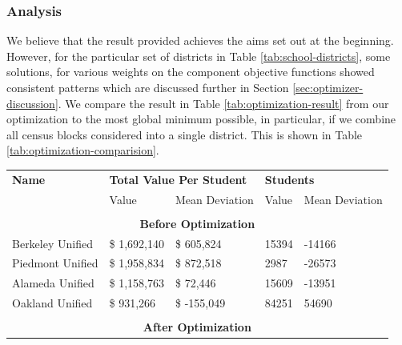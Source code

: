 \documentclass{article}
\begin{document}
\subsubsection{Analysis}
We believe that the result provided achieves the aims set out at the beginning. However, for the particular set of districts in Table \ref{tab:school-districts}, some solutions, for various weights on the component objective functions showed consistent patterns which are discussed further in Section \ref{sec:optimizer-discussion}. We compare the result in Table \ref{tab:optimization-result} from our optimization to the most global minimum possible, in particular, if we combine all census blocks considered into a single district. This is shown in Table \ref{tab:optimization-comparision}.

\begin{table}[H]
    \centering
    \begin{tabular}{l|ll|ll} \hline
         \textbf{Name}      & \multicolumn{2}{l|}{\textbf{Total Value Per Student}}         & \multicolumn{2}{l}{\textbf{Students}}\\
                            & Value                                       & Mean Deviation  & Value  & Mean Deviation \\ \hline
         \multicolumn{5}{c}{} \\
         \multicolumn{5}{c}{\textbf{Before Optimization}} \\ \hline
         Berkeley Unified   & \$ 1,692,140                                & \$ 605,824      & 15394  & -14166 \\
         Piedmont Unified   & \$ 1,958,834                                & \$ 872,518      & 2987   & -26573 \\ 
         Alameda Unified    & \$ 1,158,763                                & \$ 72,446       & 15609  & -13951  \\ 
         Oakland Unified    & \$ 931,266                                  & \$ -155,049     & 84251  &  54690 \\ 
         \multicolumn{5}{c}{} \\
         \multicolumn{5}{c}{\textbf{After Optimization}} \\ \hline

\end{tabular}
\end{table}
\end{document}
